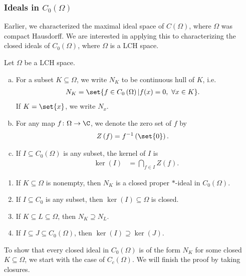 \documentclass[10pt]{mypackage}
\begin{document}
\subsubsection{Ideals in $C_0\left(\Omega\right)$}%
Earlier, we characterized the maximal ideal space of $C\left(\Omega\right)$, where $\Omega$ was compact Hausdorff. We are interested in applying this to characterizing the closed ideals of $C_0\left(\Omega\right)$, where $\Omega$ is a LCH space.
\begin{definition}
  Let $\Omega$ be a LCH space.
  \begin{enumerate}[(a)]
    \item For a subset $K\subseteq \Omega$, we write $N_K$ to be continuous hull of $K$, i.e.
      \begin{align*}
        N_K &= \set{f\in C_0\left(\Omega\right) | f(x)=0,~\forall x\in K}.
      \end{align*}
      If $K = \set{x}$, we write $N_x$.
    \item For any map $f\colon \Omega\rightarrow \C$, we denote the zero set of $f$ by
      \begin{align*}
        Z\left(f\right) &= f^{-1}\left(\set{0}\right).
      \end{align*}
    \item If $I\subseteq C_0\left(\Omega\right)$ is any subset, the kernel of $I$ is
      \begin{align*}
        \ker\left(I\right) &= \bigcap_{f\in I}Z\left(f\right).
      \end{align*}
  \end{enumerate}
\end{definition}
\begin{fact}\hfill
  \begin{enumerate}[(1)]
    \item If $K\subseteq \Omega$ is nonempty, then $N_K$ is a closed proper $\ast$-ideal in $C_0\left(\Omega\right)$.
    \item If $I\subseteq C_0$ is any subset, then $\ker\left(I\right) \subseteq \Omega$ is closed.
    \item If $K\subseteq L\subseteq \Omega$, then $N_K\supseteq N_L$.
    \item If $I\subseteq J\subseteq C_0\left(\Omega\right)$, then $\ker\left(I\right)\supseteq \ker\left(J\right)$.
  \end{enumerate}
\end{fact}
To show that every closed ideal in $C_0\left(\Omega\right)$ is of the form $N_K$ for some closed $K\subseteq \Omega$, we start with the case of $C_c\left(\Omega\right)$. We will finish the proof by taking closures.
\end{document}
